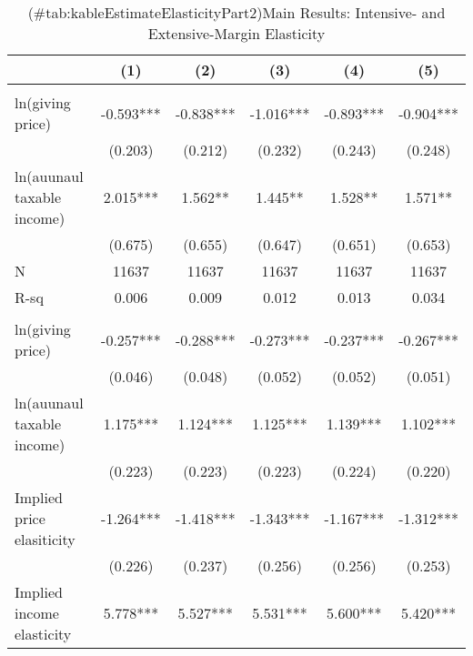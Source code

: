 \documentclass[
]{article}
\begin{document}
\begin{table}

\caption{(\#tab:kableEstimateElasticityPart2)Main Results: Intensive- and Extensive-Margin Elasticity}
\centering
\fontsize{7}{9}\selectfont
\begin{threeparttable}
\begin{tabular}[t]{lccccc}
\toprule
 & (1) & (2) & (3) & (4) & (5)\\
\midrule
\addlinespace[0.3em]
\multicolumn{6}{l}{\textbf{Intensive-Margin Elasticity}}\\
\hspace{1em}ln(giving price) & -0.593*** & -0.838*** & -1.016*** & -0.893*** & -0.904***\\
\hspace{1em} & (0.203) & (0.212) & (0.232) & (0.243) & (0.248)\\
\hspace{1em}ln(auunaul taxable income) & 2.015*** & 1.562** & 1.445** & 1.528** & 1.571**\\
\hspace{1em} & (0.675) & (0.655) & (0.647) & (0.651) & (0.653)\\
\hspace{1em}N & 11637 & 11637 & 11637 & 11637 & 11637\\
\hspace{1em}R-sq & 0.006 & 0.009 & 0.012 & 0.013 & 0.034\\
\addlinespace[0.3em]
\multicolumn{6}{l}{\textbf{Extensive-Margin Elasticity}}\\
\hspace{1em}ln(giving price) & -0.257*** & -0.288*** & -0.273*** & -0.237*** & -0.267***\\
\hspace{1em} & (0.046) & (0.048) & (0.052) & (0.052) & (0.051)\\
\hspace{1em}ln(auunaul taxable income) & 1.175*** & 1.124*** & 1.125*** & 1.139*** & 1.102***\\
\hspace{1em} & (0.223) & (0.223) & (0.223) & (0.224) & (0.220)\\
\hspace{1em}Implied price elasiticity & -1.264*** & -1.418*** & -1.343*** & -1.167*** & -1.312***\\
\hspace{1em} & (0.226) & (0.237) & (0.256) & (0.256) & (0.253)\\
\hspace{1em}Implied income elasticity & 5.778*** & 5.527*** & 5.531*** & 5.600*** & 5.420***\\

\end{tabular}
\end{threeparttable}
\end{table}
\end{document}
